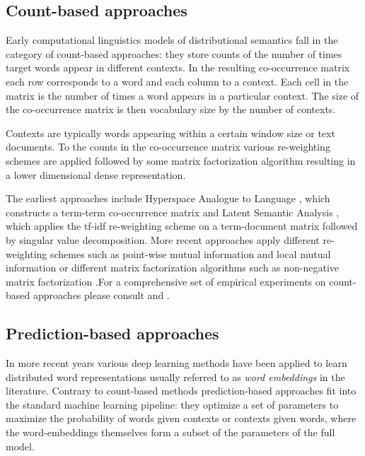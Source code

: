 \subsection{Count-based approaches}
\label{sec:count}

Early computational linguistics models of distributional semantics fall in the category of
count-based approaches: they store counts of the number of times target words appear in different
contexts. In the resulting co-occurrence matrix
each row corresponds to a
word and each column to a context. Each cell in the matrix is the number of times a word 
appears in a particular context.
The size of the co-occurrence matrix is then vocabulary size by the number of contexts.

Contexts are typically words appearing within a certain window size or text documents.
To the counts in the co-occurrence matrix various re-weighting schemes are applied followed 
by some matrix factorization algorithm resulting in a lower dimensional dense representation.

The earliest approaches include Hyperspace Analogue to Language \citep{lund1996producing},
which constructs a term-term co-occurrence matrix and Latent Semantic Analysis \citep{dumais2004latent},
which applies the tf-idf re-weighting scheme on a term-document matrix
followed by singular value decomposition.
More recent approaches apply different re-weighting schemes such as
point-wise mutual information \citep{bullinaria2007extracting}  and local mutual
information \citep{evert2005statistics} or different matrix factorization algorithms such as non-negative
matrix factorization \citep{baroni2014don}.For a comprehensive set of empirical experiments on count-based
approaches please consult \cite{bullinaria2007extracting} and \cite{bullinaria2012extracting}.

\subsection{Prediction-based approaches}
\label{sec:pred}
In more recent years
various deep learning methods have been applied to learn distributed word representations usually referred to
as \emph{word embeddings} in the literature.
Contrary to count-based methods prediction-based approaches fit into the
standard machine learning pipeline: they optimize a set of parameters to maximize the probability of words
given contexts or contexts given words, where the word-embeddings 
themselves form a subset of the parameters of the full model.

